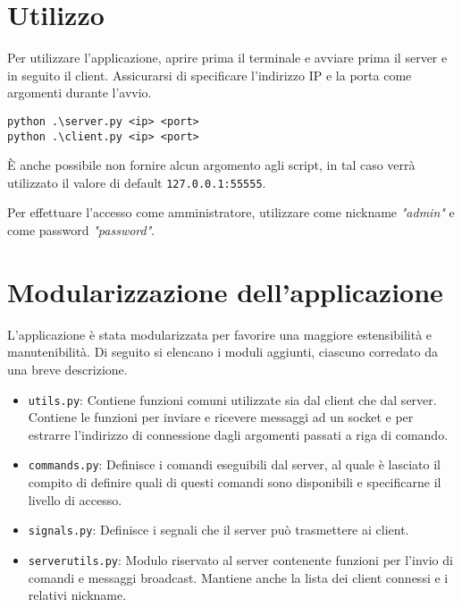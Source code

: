 \documentclass[a4paper,12pt]{report}
\begin{document}
\section{Utilizzo}
Per utilizzare l'applicazione, aprire prima il terminale e avviare prima il server e in seguito il client. Assicurarsi di specificare l'indirizzo IP e la porta come argomenti durante l'avvio.

\begin{lstlisting}
python .\server.py <ip> <port>
python .\client.py <ip> <port>
\end{lstlisting}

È anche possibile non fornire alcun argomento agli script, in tal caso verrà utilizzato il valore di default \verb|127.0.0.1:55555|. \par
Per effettuare l'accesso come amministratore, utilizzare come nickname \textit{"admin"} e come password \textit{"password"}.

\section{Modularizzazione dell'applicazione}

L'applicazione è stata modularizzata per favorire una maggiore estensibilità e manutenibilità. Di seguito si elencano i moduli aggiunti, ciascuno corredato da una breve descrizione.

\begin{itemize}
    
    \item \verb|utils.py|: Contiene funzioni comuni utilizzate sia dal client che dal server. Contiene le funzioni per inviare e ricevere messaggi ad un socket e per estrarre l'indirizzo di connessione dagli argomenti passati a riga di comando.

    \item \verb|commands.py|: Definisce i comandi eseguibili dal server, al quale è lasciato il compito di definire quali di questi comandi sono disponibili e specificarne il livello di accesso.
    
    \item \verb|signals.py|: Definisce i segnali che il server può trasmettere ai client.

    \item \verb|serverutils.py|: Modulo riservato al server contenente funzioni per l'invio di comandi e messaggi broadcast. Mantiene anche la lista dei client connessi e i relativi nickname.
    
\end{itemize}
\end{document}
